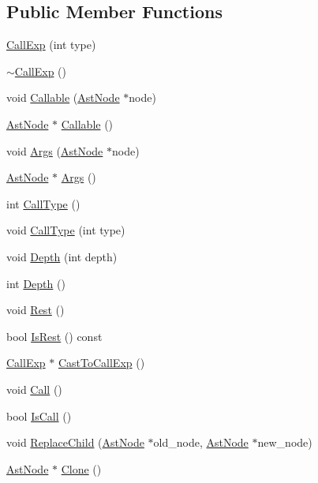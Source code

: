 \subsection*{Public Member Functions}
\begin{DoxyCompactItemize}
\item 
\hyperlink{classmocha_1_1_call_exp_ae4e9aaf5488ab763c4e64bac136650ff}{CallExp} (int type)
\item 
\hyperlink{classmocha_1_1_call_exp_a920df283bf31c2a08210ec512a72f5cc}{$\sim$CallExp} ()
\item 
void \hyperlink{classmocha_1_1_call_exp_ac907919216fc8cf3c4e7e0020e55ff40}{Callable} (\hyperlink{classmocha_1_1_ast_node}{AstNode} $\ast$node)
\item 
\hyperlink{classmocha_1_1_ast_node}{AstNode} $\ast$ \hyperlink{classmocha_1_1_call_exp_ad30716599e9bf441d004f5d97e0e83f4}{Callable} ()
\item 
void \hyperlink{classmocha_1_1_call_exp_af575c9b1d5cd088dfbc403702470cd4f}{Args} (\hyperlink{classmocha_1_1_ast_node}{AstNode} $\ast$node)
\item 
\hyperlink{classmocha_1_1_ast_node}{AstNode} $\ast$ \hyperlink{classmocha_1_1_call_exp_a10f4f286f5a1d33addd92012214f190b}{Args} ()
\item 
int \hyperlink{classmocha_1_1_call_exp_a8c6e3bec8b4d51e91782d53c58ec7980}{CallType} ()
\item 
void \hyperlink{classmocha_1_1_call_exp_ac59d3b40e2df09291a5902c4ebb4dafa}{CallType} (int type)
\item 
void \hyperlink{classmocha_1_1_call_exp_a04b99a2c8ba39a16689b2d46f30961cf}{Depth} (int depth)
\item 
int \hyperlink{classmocha_1_1_call_exp_a1ba1cf633037443e52c2b0dc5f7da503}{Depth} ()
\item 
void \hyperlink{classmocha_1_1_call_exp_affa33d340ecb3322fb01d601e3bdc660}{Rest} ()
\item 
bool \hyperlink{classmocha_1_1_call_exp_aa85eec3d1b9f2422f3566905189a1036}{IsRest} () const 
\item 
\hyperlink{classmocha_1_1_call_exp}{CallExp} $\ast$ \hyperlink{classmocha_1_1_call_exp_a60e1a2f17381dd35093e75786b1c0c6a}{CastToCallExp} ()
\item 
void \hyperlink{classmocha_1_1_call_exp_ac02db8888302cc96d46c11798642828d}{Call} ()
\item 
bool \hyperlink{classmocha_1_1_call_exp_a2b06a60d47dce8f02dbe17b716e0cbde}{IsCall} ()
\item 
void \hyperlink{classmocha_1_1_call_exp_a199afd366c874d07447b65b062ebe462}{ReplaceChild} (\hyperlink{classmocha_1_1_ast_node}{AstNode} $\ast$old\_\-node, \hyperlink{classmocha_1_1_ast_node}{AstNode} $\ast$new\_\-node)
\item 
\hyperlink{classmocha_1_1_ast_node}{AstNode} $\ast$ \hyperlink{classmocha_1_1_call_exp_a1a423dfd91b217f3a89a6ebf4f1de495}{Clone} ()
\end{DoxyCompactItemize}

